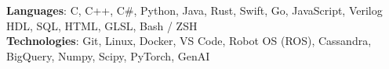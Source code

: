 \begin{itemize}[leftmargin=0.15in, label={}]
    \small{\item{
        \textbf{Languages}{: C, C++, C\#, Python, Java, Rust, Swift, Go, JavaScript, Verilog HDL, SQL, HTML, GLSL, Bash / ZSH} \\
        \textbf{Technologies}{: Git, Linux, Docker, VS Code, Robot OS (ROS), Cassandra, BigQuery, Numpy, Scipy, PyTorch, GenAI} \\
    }}
\end{itemize}